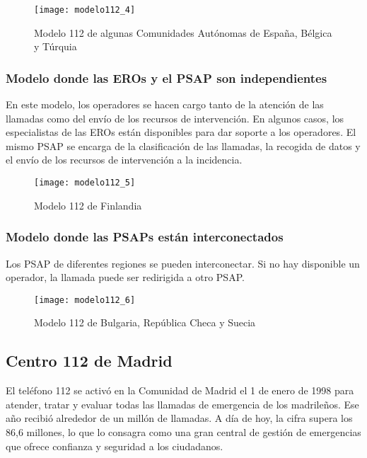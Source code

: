 \begin{figure}[htp!]
  \centering
  \texttt{[image: modelo112\_4]}
  \caption{Modelo 112 de algunas Comunidades Autónomas de España, Bélgica y Túrquia}
  \label{fig:modelo112_4}
\end{figure}

\subsubsection{Modelo donde las EROs y el PSAP son independientes}

En este modelo, los operadores se hacen cargo tanto de la atención de las llamadas como del envío de los recursos de intervención. En algunos casos, los especialistas de las EROs están disponibles para dar soporte a los operadores. El mismo PSAP se encarga de la clasificación de las llamadas, la recogida de datos y el envío de los recursos de intervención a la incidencia.

\begin{figure}[htp!]
  \centering
  \texttt{[image: modelo112\_5]}
  \caption{Modelo 112 de Finlandia}
  \label{fig:modelo112_5}
\end{figure}

\subsubsection{Modelo donde las PSAPs están interconectados}

Los PSAP de diferentes regiones se pueden interconectar. Si no hay disponible un operador, la llamada puede ser redirigida a otro PSAP.

\begin{figure}[htp!]
  \centering
  \texttt{[image: modelo112\_6]}
  \caption{Modelo 112 de Bulgaria, República Checa y Suecia}
  \label{fig:modelo112_6}
\end{figure}

\subsection{Centro 112 de Madrid}

El teléfono 112 se activó en la Comunidad de Madrid el 1 de enero de 1998 para atender, tratar y evaluar todas las llamadas de emergencia de los madrileños. Ese año recibió alrededor de un millón de llamadas. A día de hoy, la cifra supera los 86,6 millones, lo que lo consagra como una gran central de gestión de emergencias que ofrece confianza y seguridad a los ciudadanos.


